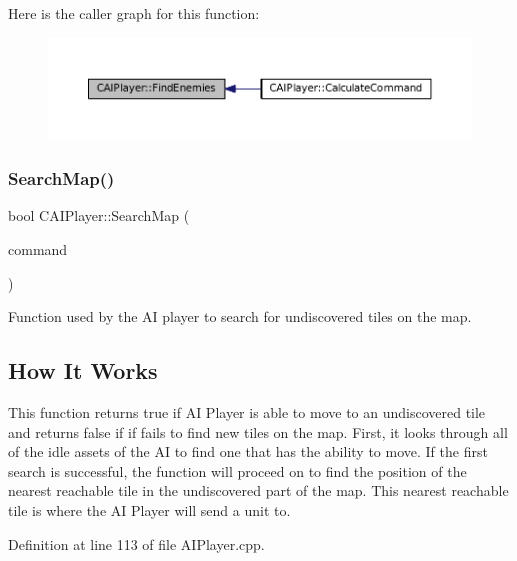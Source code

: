 Here is the caller graph for this function\+:\nopagebreak
\begin{figure}[H]
\begin{center}
\leavevmode
\includegraphics[width=350pt]{classCAIPlayer_a33b1533570e7a00114d1b85b3551e395_icgraph}
\end{center}
\end{figure}
\hypertarget{classCAIPlayer_afafbe8fc589e09a16ae1f02f2794d7b0}{}\label{classCAIPlayer_afafbe8fc589e09a16ae1f02f2794d7b0} 
\subsubsection{\texorpdfstring{Search\+Map()}{SearchMap()}}
{\footnotesize\ttfamily bool C\+A\+I\+Player\+::\+Search\+Map (\begin{DoxyParamCaption}\item[{\hyperlink{structSPlayerCommandRequest}{S\+Player\+Command\+Request} \&}]{command }\end{DoxyParamCaption})\hspace{0.3cm}{\ttfamily [protected]}}



Function used by the AI player to search for undiscovered tiles on the map. 

\hypertarget{classCAIPlayer_sm_sec}{}\subsection{How It Works}\label{classCAIPlayer_sm_sec}
This function returns true if AI Player is able to move to an undiscovered tile and returns false if if fails to find new tiles on the map. First, it looks through all of the idle assets of the AI to find one that has the ability to move. If the first search is successful, the function will proceed on to find the position of the nearest reachable tile in the undiscovered part of the map. This nearest reachable tile is where the AI Player will send a unit to. 

Definition at line 113 of file A\+I\+Player.\+cpp.



